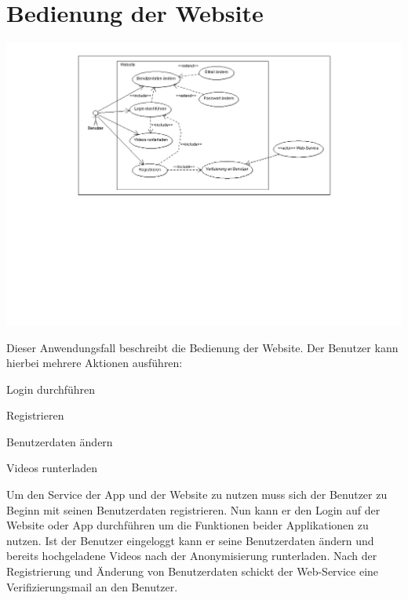 \section{Bedienung der Website}
\begin{center}
\includegraphics[width=1\textwidth]{subtopicsFuncspec/systemModels/WebsiteAWFDiagram.png}
\end{center}
Dieser Anwendungsfall beschreibt die Bedienung der Website.
Der Benutzer kann hierbei mehrere Aktionen ausführen:
\begin{description}
\item Login durchführen
\item Registrieren
\item Benutzerdaten ändern
\item Videos runterladen
\end{description}
Um den Service der App und der Website zu nutzen muss sich der Benutzer zu Beginn mit seinen Benutzerdaten registrieren. 
Nun kann er den Login auf der Website oder App durchführen um die Funktionen beider Applikationen zu nutzen. 
Ist der Benutzer eingeloggt kann er seine Benutzerdaten ändern und bereits hochgeladene Videos nach der Anonymisierung runterladen.
Nach der Registrierung und Änderung von Benutzerdaten schickt der Web-Service eine Verifizierungsmail an den Benutzer.